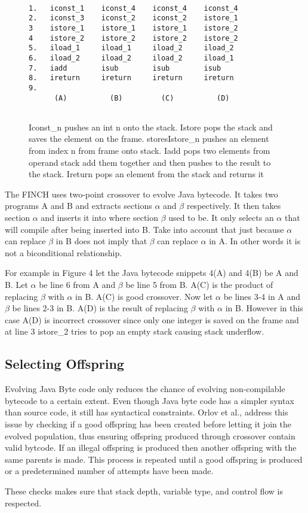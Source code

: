 \documentclass{sig-alternate}
\begin{document}
\begin{figure}
\centering
{\tt
\begin{verbatim}
1.   iconst_1    iconst_4    iconst_4    iconst_4
2.   iconst_3    iconst_2    iconst_2    istore_1
3    istore_1    istore_1    istore_1    istore_2
4    istore_2    istore_2    istore_2    istore_2
5.   iload_1     iload_1     iload_2     iload_2
6.   iload_2     iload_2     iload_2     iload_1
7.   iadd        isub        isub        isub
8.   ireturn     ireturn     ireturn     ireturn
9.                          
      (A)          (B)         (C)          (D)
          
\end{verbatim}
}
\caption{Iconst\_n pushes an int n onto the stack. Istore pops the stack and saves the element on the frame. storesIstore\_n pushes an element from index n from frame onto stack. Iadd pops two elements from operand stack add them together and then pushes to the result to the stack. Ireturn pops an element from the stack and returns it}
\end{figure}


The FINCH uses two-point crossover to evolve Java bytecode. It takes two programs A and B and extracts sections $\alpha$ and $\beta$ respectively. It then takes section $\alpha$ and inserts it into where section $\beta$ used to be. It only selects an $\alpha$ that will compile after being inserted into B. Take into account that just because $\alpha$ can replace $\beta$ in B does not imply that $\beta$ can replace $\alpha$ in A. In other words it is not a biconditional relationship.

For example in Figure 4 let the Java bytecode snippets 4(A) and 4(B) be A and B. Let $\alpha$ be line 6 from A and $\beta$ be line 5 from B. A(C) is the product of replacing $\beta$ with $\alpha$ in B. A(C) is good crossover. Now let $\alpha$ be lines 3-4 in A and $\beta$ be lines 2-3 in B. A(D) is the result of replacing $\beta$ with $\alpha$ in B. However in this case A(D) is incorrect crossover since only one integer is saved on the frame and at line 3 istore\_2 tries to pop an empty stack causing stack underflow.


\subsection{Selecting Offspring}
Evolving Java Byte code only reduces the chance of evolving non-compilable bytecode to a certain extent. Even though Java byte code has a simpler syntax than source code, it still has syntactical constraints. Orlov et al.,\cite{FINCH2:2009} address this issue by checking if a good offspring has been created before letting it join the evolved population, thus ensuring offspring produced through crossover contain valid bytcode. If an illegal offspring is produced then another offspring with the same parents is made. This process is repeated until a good offspring is produced or a predetermined number of attempts have been made.\par
These checks makes sure that stack depth, variable type, and control flow is respected.
\end{document}
